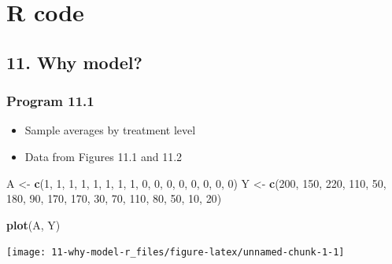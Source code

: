\documentclass[
  10pt,
]{book}
\newenvironment{Shaded}{\begin{snugshade}}{\end{snugshade}}
\newcommand{\DecValTok}[1]{\textcolor[rgb]{0.00,0.00,0.81}{#1}}
\newcommand{\KeywordTok}[1]{\textcolor[rgb]{0.13,0.29,0.53}{\textbf{#1}}}
\newcommand{\NormalTok}[1]{#1}
\newcommand{\StringTok}[1]{\textcolor[rgb]{0.31,0.60,0.02}{#1}}
\providecommand{\tightlist}{%
  \setlength{\itemsep}{0pt}\setlength{\parskip}{0pt}}
\begin{document}
\hypertarget{part-r-code}{%
\part*{R code}\label{part-r-code}}

\hypertarget{why-model}{%
\chapter*{11. Why model?}\label{why-model}}

\hypertarget{program-11.1}{%
\section{Program 11.1}\label{program-11.1}}

\begin{itemize}
\tightlist
\item
  Sample averages by treatment level
\item
  Data from Figures 11.1 and 11.2
\end{itemize}

\begin{Shaded}
\begin{Highlighting}[]
\NormalTok{A \textless{}{-}}\StringTok{ }\KeywordTok{c}\NormalTok{(}\DecValTok{1}\NormalTok{, }\DecValTok{1}\NormalTok{, }\DecValTok{1}\NormalTok{, }\DecValTok{1}\NormalTok{, }\DecValTok{1}\NormalTok{, }\DecValTok{1}\NormalTok{, }\DecValTok{1}\NormalTok{, }\DecValTok{1}\NormalTok{, }\DecValTok{0}\NormalTok{, }\DecValTok{0}\NormalTok{, }\DecValTok{0}\NormalTok{, }\DecValTok{0}\NormalTok{, }\DecValTok{0}\NormalTok{, }\DecValTok{0}\NormalTok{, }\DecValTok{0}\NormalTok{, }\DecValTok{0}\NormalTok{)}
\NormalTok{Y \textless{}{-}}\StringTok{ }\KeywordTok{c}\NormalTok{(}\DecValTok{200}\NormalTok{, }\DecValTok{150}\NormalTok{, }\DecValTok{220}\NormalTok{, }\DecValTok{110}\NormalTok{, }\DecValTok{50}\NormalTok{, }\DecValTok{180}\NormalTok{, }\DecValTok{90}\NormalTok{, }\DecValTok{170}\NormalTok{, }\DecValTok{170}\NormalTok{, }\DecValTok{30}\NormalTok{,}
       \DecValTok{70}\NormalTok{, }\DecValTok{110}\NormalTok{, }\DecValTok{80}\NormalTok{, }\DecValTok{50}\NormalTok{, }\DecValTok{10}\NormalTok{, }\DecValTok{20}\NormalTok{)}

\KeywordTok{plot}\NormalTok{(A, Y)}
\end{Highlighting}
\end{Shaded}

\begin{center}\texttt{[image: 11-why-model-r\_files/figure-latex/unnamed-chunk-1-1]} \end{center}
\end{document}
